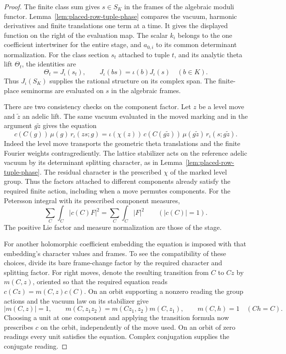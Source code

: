 \begin{proof}
The finite class sum gives \(s\in S_K\) in the frames of the
algebraic moduli functor. Lemma~\ref{lem:placed-row-tuple-phase}
compares the vacuum, harmonic derivatives and finite translations
one term at a time. It gives the displayed function on the right
of the evaluation map. The scalar \(k_i\) belongs to the one
coefficient intertwiner for the entire stage, and \(a_{0,i}\)
to its common determinant normalization. For the class section \(s_t\) attached to tuple \(t\), and
its analytic theta lift \(\Theta_t\), the identities are
\[
        \Theta_t=J_\iota(s_t),\qquad
        J_\iota(bs)=\iota(b)J_\iota(s)\quad(b\in K).
\]
Thus \(J_\iota(S_K)\) supplies the rational structure on its
complex span. The finite-place seminorms are evaluated on \(s\)
in the algebraic frames.

There are two consistency checks on the component factor.
Let \(z\) be a level move and \(\tilde z\) an adelic lift.
The same vacuum evaluated in the moved marking and in the
argument \(g\tilde z\) gives the equation
\[
 c(C(g))\,\mu(g)\,r_\iota(zs;g)=
 \iota(\chi(z))\,
 c(C(g\tilde z))\,\mu(g\tilde z)\,r_\iota(s;g\tilde z).
\]
Indeed the level move transports the geometric theta translations
and the finite Fourier weights contragrediently. The lattice
stabilizer acts on the reference adelic vacuum by its determinant
splitting character, as in Lemma~\ref{lem:placed-row-tuple-phase}.
The residual character is the prescribed \(\chi\) of the marked
level group. Thus the factors attached to different components
already satisfy the required finite action, including when a move
permutes components. For the Petersson integral with its prescribed component measures,
\[
    \sum_C\int_C|c(C)F|^2=\sum_C\int_C|F|^2
                  \qquad (|c(C)|=1).
\]
The positive Lie factor and measure normalization are those of
the stage.

For another holomorphic coefficient embedding the equation is
imposed with that embedding's character values and frames.
To see the compatibility of these choices, divide its bare
frame-change factor by the required character and splitting
factor. For right moves, denote the resulting transition from
\(C\) to \(Cz\) by \(m(C,z)\), oriented so that the required
equation reads \(c(Cz)=m(C,z)c(C)\). On an orbit supporting
a nonzero reading the group actions and the vacuum law on its
stabilizer give
\[
 |m(C,z)|=1,\qquad
 m(C,z_1z_2)=m(Cz_1,z_2)m(C,z_1),\qquad
 m(C,h)=1\quad(Ch=C).
\]
Choosing a unit at one component and applying the transition
formula now prescribes \(c\) on the orbit, independently of the
move used. On an orbit of zero readings every unit satisfies
the equation. Complex conjugation supplies the conjugate reading.


\end{proof}
